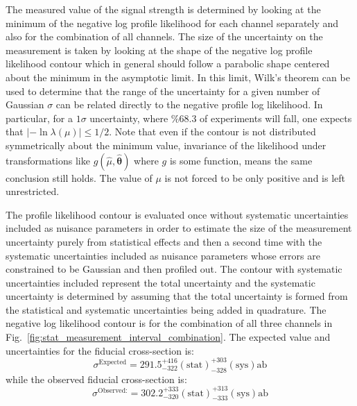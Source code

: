 The measured value of the signal strength is determined by looking at the minimum 
of the negative log profile likelihood for each channel separately and also 
for the combination of all channels. The size of the uncertainty on the 
measurement is taken by looking at the shape of the negative log 
profile likelihood contour which in general should follow a parabolic
shape centered about the minimum in the asymptotic limit. In this limit,
Wilk's theorem \cite{Wilk:1938}
can be used \cite{PDG:2014}
to determine that
the range of the 
uncertainty for a given number of Gaussian $\sigma$ can be related
directly 
to the negative profile log likelihood.  In particular, for 
a $1\sigma$ uncertainty, where $\% 68.3$ of experiments will fall, 
one expects that 
$|-\ln \lambda(\mu)| \leq 1/2$.
Note that even if the contour is not distributed symmetrically about the minimum
value, invariance of the likelihood under 
transformations like $g(\hat{\mu},\hat{\boldsymbol{\theta}})$ where $g$ is some function, 
means the same conclusion still holds.
The value of $\mu$ is not forced to be only positive and is left unrestricted. 

The profile likelihood contour is evaluated once without systematic uncertainties included
as nuisance parameters in order to estimate the size of the measurement uncertainty purely 
from statistical effects and then a second time with the systematic uncertainties included
as nuisance parameters whose errors are constrained to be Gaussian and then 
profiled out. The contour with systematic uncertainties included represent
the total uncertainty and the systematic uncertainty is determined by assuming that
the total uncertainty is formed from the statistical and systematic uncertainties being added
in quadrature.
The negative log likelihood contour is 
for the combination of all three channels in 
Fig.~\ref{fig:stat_measurement_interval_combination}.
The expected value and uncertainties for the fiducial cross-section is:
\begin{equation}
\sigma^{\textrm{Expected}} = 291.5  ^{+416}_{-322} (\textrm{stat}) ^{+303}_{-328} (\textrm{sys}) \textrm{ab}
\end{equation}
while the observed fiducial cross-section is:
\begin{equation}
\sigma^{\textrm{Observed:}} = 302.2  ^{+333}_{-320} (\textrm{stat}) ^{+313}_{-333} (\textrm{sys}) \textrm{ab}
\end{equation}

